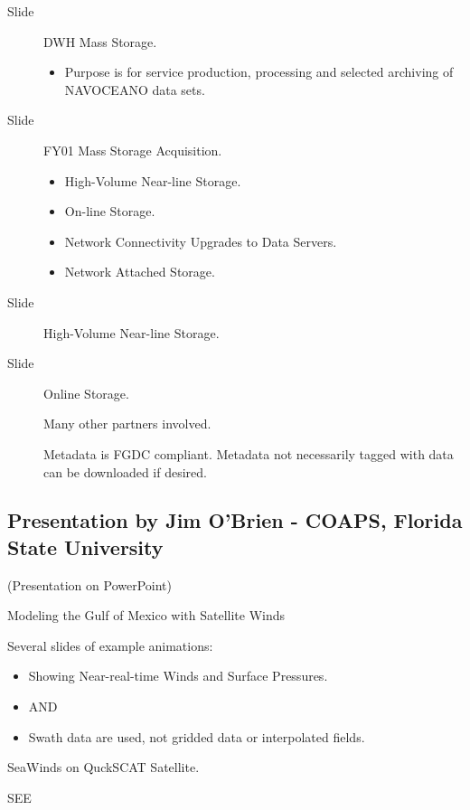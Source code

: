 \begin{description}
\item[Slide] DWH Mass Storage.
\begin{itemize}
\item Purpose is for service production, processing and selected archiving of NAVOCEANO data sets.
\end{itemize}

\item[Slide] FY01 Mass Storage Acquisition.
\begin{itemize}
\item       High-Volume Near-line Storage.
\item       On-line Storage.
\item Network Connectivity Upgrades to Data Servers.
\item         Network Attached Storage.
\end{itemize}

\item[Slide] High-Volume Near-line Storage.

\item[Slide] Online Storage.

Many other partners involved.

Metadata is FGDC compliant.  Metadata not necessarily tagged with data can be downloaded if 
desired.
\end{description}

\subsection{Presentation by Jim O'Brien -  COAPS, Florida State University}

(Presentation on PowerPoint)

Modeling the Gulf of Mexico with Satellite Winds

Several slides of example animations:
\begin{itemize}
\item     Showing Near-real-time Winds and Surface Pressures.
\item     {} AND 
\item     Swath data are used, not gridded data or interpolated fields.
\end{itemize}

SeaWinds on QuckSCAT Satellite.

SEE  

